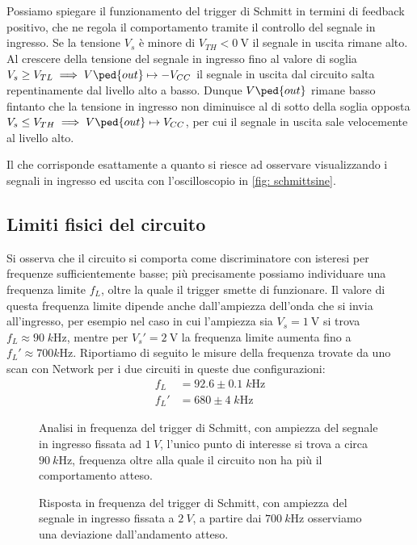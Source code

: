 \documentclass[10pt, a4paper, italian]{article}
\begin{document}
Possiamo spiegare il funzionamento del trigger di Schmitt in termini di
feedback positivo, che ne regola il comportamento tramite il controllo del
segnale in ingresso. Se la tensione $V_s$ è minore di $V_{TH} < \SI{0}{\V}$
il segnale in uscita rimane alto. Al crescere della tensione del segnale
in ingresso fino al valore di soglia
$V_s \geq V_{TL} \implies V\ped{out} \mapsto -V_{CC}$ il segnale in uscita
dal circuito salta repentinamente dal livello alto a basso. Dunque
$V\ped{out}$ rimane basso fintanto che la tensione in ingresso non diminuisce
al di sotto della soglia opposta
$V_s \leq V_{TH} \implies V\ped{out} \mapsto V_{CC}$, per cui il segnale in
uscita sale velocemente al livello alto.

Il che corrisponde esattamente a quanto si riesce ad osservare visualizzando
i segnali in ingresso ed uscita con l'oscilloscopio in \cref{fig: schmittsine}.

\subsection{Limiti fisici del circuito}\label{sub: trglim}
Si osserva che il circuito si comporta come discriminatore con isteresi per
frequenze sufficientemente basse; più precisamente possiamo individuare una
frequenza limite $f_L$, oltre la quale il trigger smette di funzionare.
Il valore di questa frequenza limite dipende anche dall'ampiezza dell'onda che
si invia all'ingresso, per esempio nel caso in cui l'ampiezza sia
$V_s = \SI{1}{\V}$ si trova $f_L \approx 90 \; \si{k\Hz}$, mentre per
$V_s' = \SI{2}{\V}$ la frequenza limite aumenta fino a
$f_L' \approx 700 \si{k\Hz}$. Riportiamo di seguito le misure della frequenza
trovate da uno scan con Network per i due circuiti in queste due
configurazioni:
\begin{align*}
f_L &= 92.6 \pm 0.1 \; \si{k\Hz} \\
f_L' &= 680 \pm 4 \; \si{k\Hz}
\end{align*}

\begin{figure}[htbp]
	\centering
	\caption{Analisi in frequenza del trigger di Schmitt, con ampiezza del segnale
	in ingresso fissata ad $\SI{1}{V}$, l'unico punto di interesse si trova a
	circa $\SI{90}{k\Hz}$, frequenza oltre alla quale il circuito non ha più
	il comportamento atteso.}
\end{figure}

\begin{figure}[htbp]
	\centering
	\caption{Risposta in frequenza del trigger di Schmitt, con ampiezza del
	segnale in ingresso fissata a $\SI{2}{V}$, a partire dai $\SI{700}{k\Hz}$
	osserviamo una deviazione dall'andamento atteso.}
\end{figure}
\end{document}
